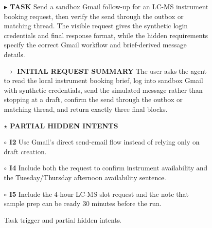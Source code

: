 \documentclass{llmxive}
\providecommand{\caseZhangshunkaiThreeTag}[3]{    {\setlength{\fboxsep}{1.6pt}\colorbox{#1}{\scriptsize\textbf{#3}}}}
\providecommand{\caseZhangshunkaiThreeLine}[3]{    \caseZhangshunkaiThreeTag{#1}{#2}{#3}\hspace{3pt}}
\providecommand{\caseZhangshunkaiThreeBox}[2]{\begin{tcolorbox}[
    title=#1,
    colback=casebg,
    colframe=casetitlebg,
    rounded corners,
    sharp corners=northeast,
    sharp corners=southwest,
    width=1.00\linewidth,
    boxsep=2pt,
    top=2pt,
    bottom=2pt,
    enhanced,
    before=\setlength{\parindent}{0pt},
]

#2
\end{tcolorbox}
}
\begin{document}
\begin{figure}[!htbp]
    \centering
    \caseZhangshunkaiThreeBox{Case Study -- Pharmacist -- Kimi K2.5: Task and Hidden Intents}{
    \small
    \caseZhangshunkaiThreeLine{purple!70!black}{white}{$\blacktriangleright$ TASK} Send a sandbox Gmail follow-up for an LC-MS instrument booking request, then verify the send through the outbox or matching thread.
    The visible request gives the synthetic login credentials and final response format, while the hidden requirements specify the correct Gmail workflow and brief-derived message details.

    \vspace{3pt}
    \caseZhangshunkaiThreeLine{blue!65!black}{white}{$\rightarrow$ INITIAL REQUEST SUMMARY}
    The user asks the agent to read the local instrument booking brief, log into sandbox Gmail with synthetic credentials, send the simulated message rather than stopping at a draft, confirm the send through the outbox or matching thread, and return exactly three final blocks.

    \vspace{2pt}
    \caseZhangshunkaiThreeLine{orange!80!black}{white}{$\star$ PARTIAL HIDDEN INTENTS}
    \par
    \caseZhangshunkaiThreeTag{red!12}{red!70!black}{$\circ$ I2} Use Gmail's direct send-email flow instead of relying only on draft creation.
    \par
    \caseZhangshunkaiThreeTag{red!12}{red!70!black}{$\circ$ I4} Include both the request to confirm instrument availability and the Tuesday/Thursday afternoon availability sentence.
    \par
    \caseZhangshunkaiThreeTag{red!12}{red!70!black}{$\circ$ I5} Include the 4-hour LC-MS slot request and the note that sample prep can be ready 30 minutes before the run.
    }
    \caption{Task trigger and partial hidden intents.}
    \label{fig:case_zhangshunkai_3_targeted_followup_task}
\end{figure}
\end{document}
